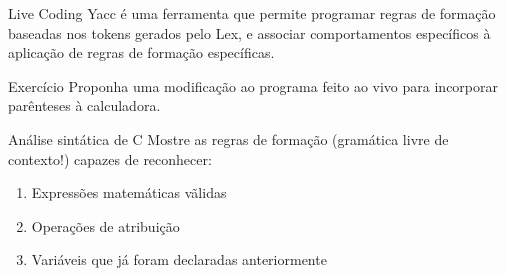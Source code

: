 \documentclass{beamer}
\begin{document}
\begin{frame}{Live Coding}
  \centering
  \Large
  Yacc é uma ferramenta que permite programar regras de formação baseadas nos
  tokens gerados pelo Lex, e associar comportamentos específicos à aplicação de
  regras de formação específicas.
\end{frame}

\begin{frame}{Exercício}
  \centering
  \large
  Proponha uma modificação ao programa feito ao vivo para incorporar parênteses
  à calculadora.
\end{frame}

\begin{frame}{Análise sintática de C}
\large
  Mostre as regras de formação (gramática livre de contexto!) capazes de reconhecer:
  \begin{enumerate}
    \item Expressões matemáticas vãlidas
    \item Operações de atribuição
    \item Variáveis que já foram declaradas anteriormente
  \end{enumerate}
\end{frame}
\end{document}

